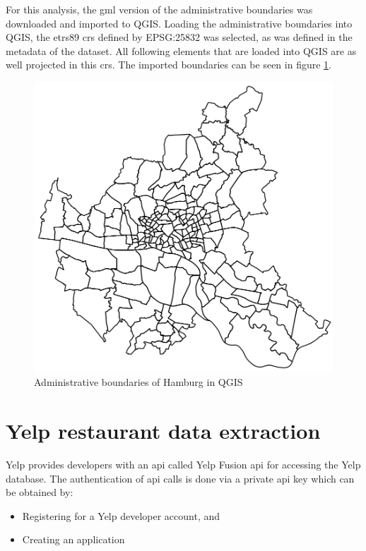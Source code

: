\documentclass[a4paper, 11pt, oneside]{Thesis}  %
\begin{document}
For this analysis, the \ac{gml} version of the administrative boundaries was downloaded and imported to QGIS. Loading the administrative boundaries into QGIS, the \ac{etrs89} \ac{crs} defined by EPSG:25832 was selected, as was defined in the metadata of the dataset. All following elements that are loaded into QGIS are as well projected in this \ac{crs}. The imported boundaries can be seen in figure \ref{fig:administrative_boundaries}.

\begin{figure}[h]
\includegraphics[scale=0.5]{Figures/Hamburg_Administrative_Boundaries.png}
\centering
\caption{Administrative boundaries of Hamburg in QGIS}
\label{fig:administrative_boundaries}
\end{figure}


\section{Yelp restaurant data extraction}

Yelp provides developers with an \ac{api} called Yelp Fusion \ac{api} for accessing the Yelp database. The authentication of \ac{api} calls is done via a private \ac{api} key which can be obtained by:
\begin{itemize}
\item Registering for a Yelp developer account, and
\item Creating an application
\end{itemize}
\end{document}
